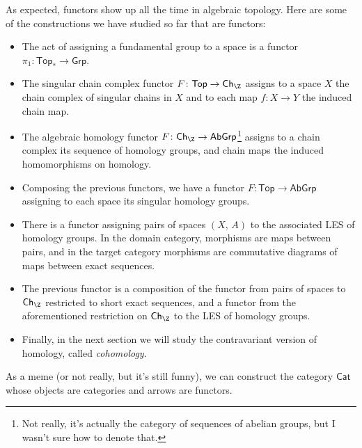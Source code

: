 \begin{example}
   As expected, functors show up all the time in algebraic topology. Here are some of the constructions we have studied so far that are functors:
   \begin{itemize}
       \item The act of assigning a fundamental group to a space is a functor $\pi_1 \colon \mathsf{Top_*}  \to \mathsf{Grp} $.
       \item The singular chain complex functor $F \colon \mathsf{Top}  \to \mathsf{Ch} _{\Z}$ assigns to a space $X$ the chain complex of singular chains in $X$ and to each map $f\colon X \to Y$ the induced chain map. 
       \item The algebraic homology functor $F \colon \mathsf{Ch}_{\Z} \to \mathsf{AbGrp}  $\footnote{Not really, it's actually the category of sequences of abelian groups, but I wasn't sure how to denote that.} assigns to a chain complex its sequence of homology groups, and chain maps the induced homomorphisms on homology.
        \item Composing the previous functors, we have a functor $F \colon \mathsf{Top}  \to \mathsf{AbGrp} $ assigning to each space its singular homology groups.
        \item There is a functor assigning pairs of spaces $(X,\,A)$ to the associated LES of homology groups. In the domain category, morphisms are maps between pairs, and in the target category morphisms are commutative diagrams of maps between exact sequences. 
        \item The previous functor is a composition of the functor from pairs of spaces to $\mathsf{Ch} _{\Z}$ restricted to short exact sequences, and a functor from the aforementioned restriction on $\mathsf{Ch} _{\Z}$ to the LES of homology groups.
        \item Finally, in the next section we will study the contravariant version of homology, called \emph{cohomology}.
   \end{itemize}
\end{example}
\begin{note}
    As a meme (or not really, but it's still funny), we can construct the category $\mathsf{Cat}$ whose objects are categories and arrows are functors.
\end{note}
